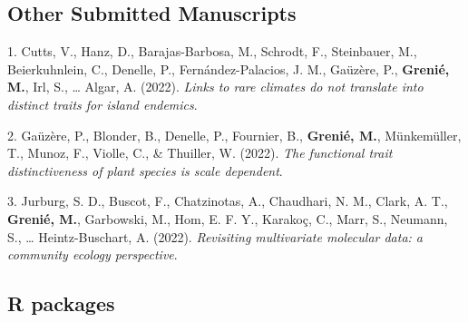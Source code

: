 \documentclass[10pt,a4paper,]{article}
\begin{document}
\hypertarget{other-submitted-manuscripts}{%
\subsection{Other Submitted
Manuscripts}\label{other-submitted-manuscripts}}

\hypertarget{bibliography}{}
\leavevmode\hypertarget{ref-Cutts_links_2022}{}%
1. Cutts, V., Hanz, D., Barajas-Barbosa, M., Schrodt, F., Steinbauer,
M., Beierkuhnlein, C., Denelle, P., Fernández-Palacios, J. M., Gaüzère,
P., \textbf{Grenié, M.}, Irl, S., \ldots{} Algar, A. (2022). \emph{Links
to rare climates do not translate into distinct traits for island
endemics}.

\leavevmode\hypertarget{ref-Gauzere_functional_distinctiveness}{}%
2. Gaüzère, P., Blonder, B., Denelle, P., Fournier, B.,
\textbf{Grenié, M.}, Münkemüller, T., Munoz, F., Violle, C., \&
Thuiller, W. (2022). \emph{The functional trait distinctiveness of plant
species is scale dependent}.

\leavevmode\hypertarget{ref-Jurburg_community_perspective_2022}{}%
3. Jurburg, S. D., Buscot, F., Chatzinotas, A., Chaudhari, N. M., Clark,
A. T., \textbf{Grenié, M.}, Garbowski, M., Hom, E. F. Y., Karakoç, C.,
Marr, S., Neumann, S., \ldots{} Heintz-Buschart, A. (2022).
\emph{Revisiting multivariate molecular data: a community ecology
perspective}.

\hypertarget{r-packages}{%
\subsection{R packages}\label{r-packages}}
\end{document}
